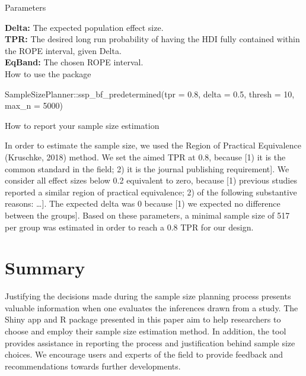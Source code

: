 \documentclass[
  english,
  man,floatsintext]{apa6}
\newenvironment{Shaded}{\begin{snugshade}}{\end{snugshade}}
\newcommand{\AttributeTok}[1]{\textcolor[rgb]{0.77,0.63,0.00}{#1}}
\newcommand{\DecValTok}[1]{\textcolor[rgb]{0.00,0.00,0.81}{#1}}
\newcommand{\FloatTok}[1]{\textcolor[rgb]{0.00,0.00,0.81}{#1}}
\newcommand{\FunctionTok}[1]{\textcolor[rgb]{0.00,0.00,0.00}{#1}}
\newcommand{\NormalTok}[1]{#1}
\newcommand{\SpecialCharTok}[1]{\textcolor[rgb]{0.00,0.00,0.00}{#1}}
\begin{document}
Parameters

\textbf{Delta:} The expected population effect size.\\
\textbf{TPR:} The desired long run probability of having the HDI fully contained within the ROPE interval, given Delta.\\
\textbf{EqBand:} The chosen ROPE interval.\\

How to use the package

\begin{Shaded}
\begin{Highlighting}[]
\NormalTok{SampleSizePlanner}\SpecialCharTok{::}\FunctionTok{ssp\_bf\_predetermined}\NormalTok{(}\AttributeTok{tpr =} \FloatTok{0.8}\NormalTok{, }\AttributeTok{delta =} \FloatTok{0.5}\NormalTok{, }
    \AttributeTok{thresh =} \DecValTok{10}\NormalTok{, }\AttributeTok{max\_n =} \DecValTok{5000}\NormalTok{)}
\end{Highlighting}
\end{Shaded}

How to report your sample size estimation

In order to estimate the sample size, we used the Region of Practical Equivalence (Kruschke, 2018) method. We set the aimed TPR at 0.8, because {[}1) it is the common standard in the field; 2) it is the journal publishing requirement{]}. We consider all effect sizes below 0.2 equivalent to zero, because {[}1) previous studies reported a similar region of practical equivalence; 2) of the following substantive reasons: \ldots{]}. The expected delta was 0 because {[}1) we expected no difference between the groups{]}. Based on these parameters, a minimal sample size of 517 per group was estimated in order to reach a 0.8 TPR for our design.

\hypertarget{summary}{%
\section{Summary}\label{summary}}

Justifying the decisions made during the sample size planning process presents valuable information when one evaluates the inferences drawn from a study. The Shiny app and R package presented in this paper aim to help researchers to choose and employ their sample size estimation method. In addition, the tool provides assistance in reporting the process and justification behind sample size choices. We encourage users and experts of the field to provide feedback and recommendations towards further developments.
\end{document}
